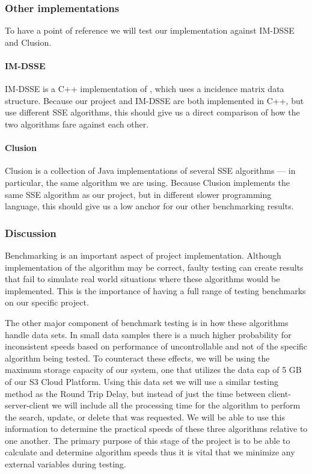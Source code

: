 \subsubsection {Other implementations}

To have a point of reference we will test our implementation against IM-DSSE and Clusion.

\paragraph{IM-DSSE}
IM-DSSE \cite{im-dsse} is a C++ implementation of \cite{yavuz15}, which uses a incidence matrix data structure. Because our project and IM-DSSE are both implemented in C++, but use different SSE algorithms, this should give us a direct comparison of how the two algorithms fare against each other.

\paragraph{Clusion}
Clusion \cite{clusion} is a collection of Java implementations of several SSE algorithms --- in particular, the same algorithm we are using. Because Clusion implements the same SSE algorithm as our project, but in different slower programming language, this should give us a low anchor for our other benchmarking results.

\subsubsection {Discussion}

Benchmarking is an important aspect of project implementation.
Although implementation of the algorithm may be correct, faulty testing can create results that fail to simulate real world situations where these algorithms would be implemented.
This is the importance of having a full range of testing benchmarks on our specific project.

The other major component of benchmark testing is in how these algorithms handle data sets.
In small data samples there is a much higher probability for inconsistent speeds based on performance of uncontrollable and not of the specific algorithm being tested.
To counteract these effects, we will be using the maximum storage capacity of our system, one that utilizes the data cap of 5 GB of our S3 Cloud Platform. Using this data set we will use a similar testing method as the Round Trip Delay, but instead of just the time between client-server-client we will include all the processing time for the algorithm to perform the search, update, or delete that was requested.
We will be able to use this information to determine the practical speeds of these three algorithms relative to one another.
The primary purpose of this stage of the project is to be able to calculate and determine algorithm speeds thus it is vital that we minimize any external variables during testing. 


